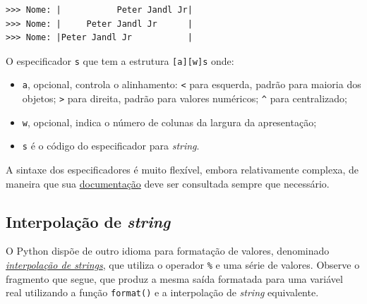 \documentclass[
]{book}
\newenvironment{Shaded}{\begin{snugshade}}{\end{snugshade}}
\newcommand{\BuiltInTok}[1]{#1}
\newcommand{\FloatTok}[1]{\textcolor[rgb]{0.00,0.00,0.81}{#1}}
\newcommand{\NormalTok}[1]{#1}
\newcommand{\OperatorTok}[1]{\textcolor[rgb]{0.81,0.36,0.00}{\textbf{#1}}}
\newcommand{\SpecialCharTok}[1]{\textcolor[rgb]{0.00,0.00,0.00}{#1}}
\newcommand{\StringTok}[1]{\textcolor[rgb]{0.31,0.60,0.02}{#1}}
\providecommand{\tightlist}{%
  \setlength{\itemsep}{0pt}\setlength{\parskip}{0pt}}
\begin{document}
\begin{verbatim}
>>> Nome: |           Peter Jandl Jr|
>>> Nome: |     Peter Jandl Jr      |
>>> Nome: |Peter Jandl Jr           |
\end{verbatim}

O especificador \texttt{s} que tem a estrutura \texttt{{[}a{]}{[}w{]}s} onde:

\begin{itemize}
\tightlist
\item
  \texttt{a}, opcional, controla o alinhamento: \texttt{\textless{}} para esquerda, padrão para maioria dos objetos; \texttt{\textgreater{}} para direita, padrão para valores numéricos; \texttt{\^{}} para centralizado;
\item
  \texttt{w}, opcional, indica o número de colunas da largura da apresentação;
\item
  \texttt{s} é o código do especificador para \emph{string}.
\end{itemize}

A sintaxe dos especificadores é muito flexível, embora relativamente complexa, de maneira que sua \href{https://docs.python.org/3/library/string.html\#formatspec}{documentação} deve ser consultada sempre que necessário.

\hypertarget{e-s-format-inter}{%
\subsection{\texorpdfstring{Interpolação de \emph{string}}{Interpolação de string}}\label{e-s-format-inter}}

O Python dispõe de outro idioma para formatação de valores, denominado \href{https://docs.python.org/3/tutorial/inputoutput.html\#old-string-formatting}{\emph{interpolação de strings}}, que utiliza o operador \texttt{\%} e uma série de valores. Observe o fragmento que segue, que produz a mesma saída formatada para uma variável real utilizando a função \texttt{format()} e a interpolação de \emph{string} equivalente.

\begin{Shaded}
\end{Shaded}
\end{document}
